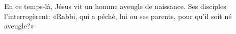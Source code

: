 En ce temps-là, Jésus vit un homme aveugle de naissance.
Ses disciples l’interrogèrent:
	«Rabbi, qui a péché, lui ou ses parents, pour qu’il soit né aveugle?»
